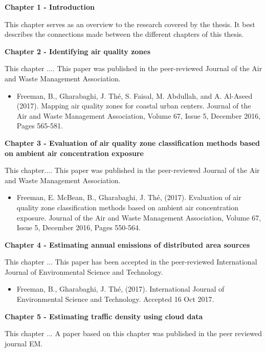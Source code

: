 \noindent \textbf{Chapter 1 - Introduction}

This chapter serves as an overview to the research covered by the thesis. It best describes the connections made between the different chapters of this thesis.

\noindent \textbf{Chapter 2 - Identifying air quality zones}

This chapter .... This paper was published in the peer-reviewed Journal of the Air and Waste Management Association.

\begin{itemize}
\item Freeman, B., Gharabaghi, J.  Th\'e, S. Faisal, M. Abdullah, and A. Al-Aseed (2017). Mapping air quality zones for coastal urban centers. Journal of the Air and Waste Management Association, Volume 67, Issue 5, December 2016, Pages 565-581.
\end{itemize}

\noindent \textbf{Chapter 3 - Evaluation of air quality zone classification methods based on ambient air concentration exposure}

This chapter.... This paper was published in the peer-reviewed Journal of the Air and Waste Management Association.

\begin{itemize}
\item Freeman, E. McBean, B., Gharabaghi, J.  Th\'e, (2017). Evaluation of air quality zone classification methods based on ambient air concentration exposure. Journal of the Air and Waste Management Association, Volume 67, Issue 5, December 2016, Pages 550-564.
\end{itemize}

\noindent \textbf{Chapter 4 - Estimating annual emissions of distributed area sources}

This chapter ... This paper has been accepted in the peer-reviewed International Journal of Environmental Science and Technology.

\begin{itemize}
\item Freeman, B., Gharabaghi, J.  Th\'e, (2017). International Journal of Environmental Science and Technology. Accepted 16 Oct 2017.
\end{itemize}

\noindent \textbf{Chapter 5 - Estimating traffic density using cloud data}

This chapter ... A paper based on this chapter was published in the peer reviewed journal EM.

